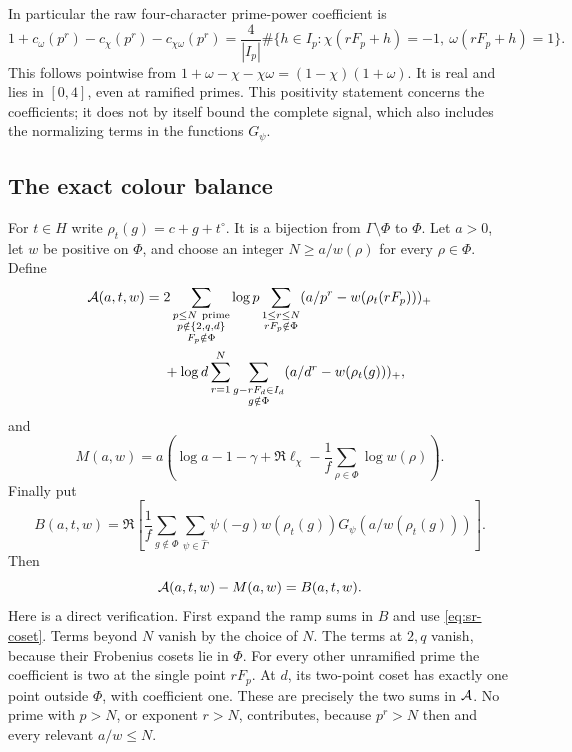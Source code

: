 In particular the raw four-character prime-power coefficient is
\[
 1+c_\omega(p^r)-c_\chi(p^r)-c_{\chi\omega}(p^r)
 =\frac4{|I_p|}
   \#\{h\in I_p:\chi(rF_p+h)=-1,\ \omega(rF_p+h)=1\}.
\]
This follows pointwise from
\(1+\omega-\chi-\chi\omega=(1-\chi)(1+\omega)\).
It is real and lies in \([0,4]\), even at ramified primes.
This positivity statement concerns the coefficients; it does not by itself
bound the complete signal, which also includes the normalizing terms in
the functions \(G_\psi\).

\subsection{The exact colour balance}
For \(t\in H\) write \(\rho_t(g)=c+g+t^\circ\).
It is a bijection from \(\Gamma\setminus\Phi\) to \(\Phi\).
Let \(a>0\), let \(w\) be positive on \(\Phi\), and choose an integer
\(N\geq a/w(\rho)\) for every \(\rho\in\Phi\). Define
\[
 \begin{split}
 {\cal A}(a,t,w)={}&
 2\sum_{\substack{p\leq N\ {\rm prime}\\p\notin\{2,q,d\}\\F_p\notin\Phi}}
  \log p
  \sum_{\substack{1\leq r\leq N\\rF_p\notin\Phi}}
       (a/p^r-w(\rho_t(rF_p)))_+\\
 &+\log d\sum_{r=1}^N
   \sum_{\substack{g-rF_d\in I_d\\g\notin\Phi}}
       (a/d^r-w(\rho_t(g)))_+ ,
 \end{split}
\]
and
\[
 M(a,w)=a\left(\log a-1-\gamma+\Re\ell_\chi
                    -\frac1f\sum_{\rho\in\Phi}\log w(\rho)\right).
\]
Finally put
\[
 B(a,t,w)=\Re\left[
 \frac1f\sum_{g\notin\Phi}\sum_{\psi\in\widehat\Gamma}
    \psi(-g)w(\rho_t(g))G_\psi(a/w(\rho_t(g)))\right].
\]
Then
\begin{equation}\label{eq:sr-balance}
 {\cal A}(a,t,w)-M(a,w)=B(a,t,w).
\end{equation}
Here is a direct verification. First expand the ramp sums in \(B\) and
use \eqref{eq:sr-coset}. Terms beyond \(N\) vanish by the choice of \(N\).
The terms at \(2,q\) vanish, because their Frobenius cosets lie in \(\Phi\).
For every other unramified prime the coefficient is two at the single
point \(rF_p\). At \(d\), its two-point coset has exactly one point outside
\(\Phi\), with coefficient one. These are precisely the two sums in
\({\cal A}\). No prime with \(p>N\), or exponent \(r>N\), contributes,
because \(p^r>N\) then and every relevant \(a/w\leq N\).


